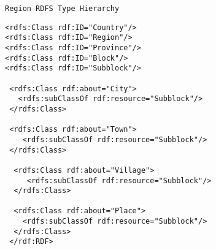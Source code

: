 \begin{verbatim}
Region RDFS Type Hierarchy 
\end{verbatim}

\vspace{-0.2in}
\footnotesize
\begin{verbatim}
<rdfs:Class rdf:ID="Country"/>
<rdfs:Class rdf:ID="Region"/>
<rdfs:Class rdf:ID="Province"/>
<rdfs:Class rdf:ID="Block"/>
<rdfs:Class rdf:ID="Subblock"/>
 
 <rdfs:Class rdf:about="City">
   <rdfs:subClassOf rdf:resource="Subblock"/>
 </rdfs:Class>

 <rdfs:Class rdf:about="Town">
    <rdfs:subClassOf rdf:resource="Subblock"/>
 </rdfs:Class>
  
  <rdfs:Class rdf:about="Village">
     <rdfs:subClassOf rdf:resource="Subblock"/>
  </rdfs:Class>

  <rdfs:Class rdf:about="Place">
    <rdfs:subClassOf rdf:resource="Subblock"/>
  </rdfs:Class>
 </rdf:RDF>     
 \end{verbatim}

     